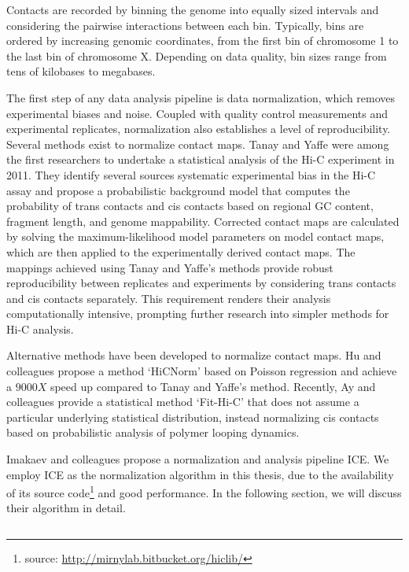 Contacts are recorded by binning the genome into equally sized intervals and considering the pairwise interactions between each bin.
Typically, bins are ordered by increasing genomic coordinates, from the first bin of chromosome 1 to the last bin of chromosome X.
Depending on data quality, bin sizes range from tens of kilobases to megabases.

The first step of any data analysis pipeline is data \gls{normalization}, which removes experimental biases and noise.  Coupled with quality
control measurements and experimental replicates, normalization also establishes a level of reproducibility.
Several methods exist to normalize contact maps.  Tanay and Yaffe were among the first researchers to undertake a statistical analysis of the
Hi-C experiment in 2011\cite{yaffe2011}.  They identify several sources systematic experimental bias in the Hi-C assay and propose a
probabilistic background model that computes the probability of \glspl{trans contact} and \glspl{cis contact} based on regional
\gls{GC} content, fragment length, and genome mappability.  Corrected contact maps are calculated by solving the maximum-likelihood model
parameters on model contact maps, which are then applied to the experimentally derived contact maps.  The mappings
achieved using Tanay and Yaffe's methods provide robust reproducibility between replicates and experiments by considering
\glspl{trans contact} and \glspl{cis contact} separately\cite{yaffe2011}.  This requirement renders their analysis computationally
intensive, prompting further research into simpler methods for Hi-C analysis.

Alternative methods have been developed to normalize contact maps.  Hu and colleagues propose a method `HiCNorm' based on Poisson
regression and achieve a $9000X$ speed up compared to Tanay and Yaffe's method\cite{hu2012}.  Recently, Ay and colleagues provide a statistical
method `Fit-Hi-C' that does not assume a particular underlying statistical distribution, instead normalizing \glspl{cis contact} based on probabilistic
analysis of polymer looping dynamics\cite{ay2014}.

Imakaev and colleagues propose a normalization and analysis pipeline \gls{ICE}\cite{imakaev2012}.  We employ \gls{ICE} as the normalization
algorithm in this thesis, due to the availability of its source code\footnote{source: \url{http://mirnylab.bitbucket.org/hiclib/}} and good
performance.  In the following section, we will discuss their algorithm in detail.

\subsection*{}

